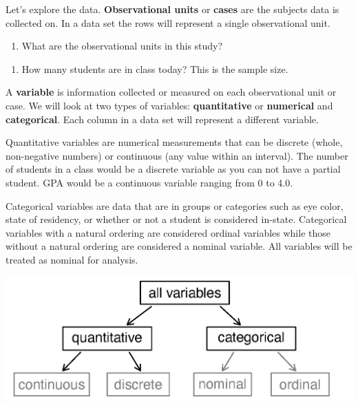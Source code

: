 \documentclass[
]{article}
\providecommand{\tightlist}{%
  \setlength{\itemsep}{0pt}\setlength{\parskip}{0pt}}
\begin{document}
Let's explore the data. \textbf{Observational units} or \textbf{cases}
are the subjects data is collected on. In a data set the rows will
represent a single observational unit.

\begin{enumerate}
\def\labelenumi{\arabic{enumi}.}
\tightlist
\item
  What are the observational units in this study?
\end{enumerate}

\vspace{0.5in}

\begin{enumerate}
\def\labelenumi{\arabic{enumi}.}
\setcounter{enumi}{1}
\tightlist
\item
  How many students are in class today? This is the sample size.
\end{enumerate}

\vspace{0.5in}

A \textbf{variable} is information collected or measured on each
observational unit or case. We will look at two types of variables:
\textbf{quantitative} or \textbf{numerical} and \textbf{categorical}.
Each column in a data set will represent a different variable.

Quantitative variables are numerical measurements that can be discrete
(whole, non-negative numbers) or continuous (any value within an
interval). The number of students in a class would be a discrete
variable as you can not have a partial student. GPA would be a
continuous variable ranging from 0 to 4.0.

Categorical variables are data that are in groups or categories such as
eye color, state of residency, or whether or not a student is considered
in-state. Categorical variables with a natural ordering are considered
ordinal variables while those without a natural ordering are considered
a nominal variable. All variables will be treated as nominal for
analysis.

\includegraphics{variables.png}
\end{document}
